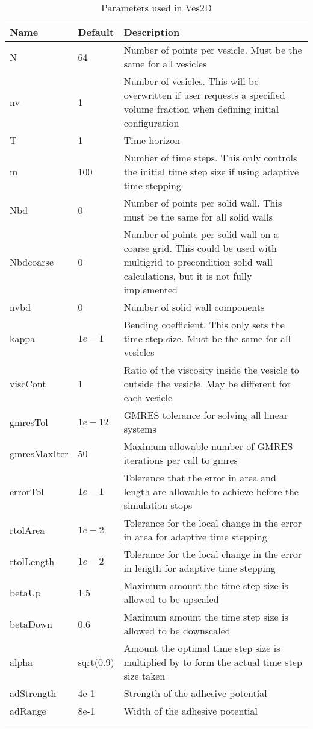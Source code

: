\documentclass[12pt]{article}
\begin{document}
\begin{longtable}{|l|l|m{8cm}|}
\hline
Name        & Default                  & 
  Description \\ \hline
N & 64 &  
Number of points per vesicle.  Must be the same for all vesicles \\ \hline
nv & 1 &  
Number of vesicles.  This will be overwritten if user requests a
specified volume fraction when defining initial configuration \\ \hline
T & 1 &  
Time horizon \\ \hline
m & 100 &  
Number of time steps.  This only controls the initial time step size if
using adaptive time stepping \\ \hline
Nbd & 0 &  
Number of points per solid wall.  This must be the same for all solid
walls \\ \hline
Nbdcoarse & 0 &  
Number of points per solid wall on a coarse grid.  This could be used
with multigrid to precondition solid wall calculations, but it is not
fully implemented \\ \hline
nvbd & 0 &  
Number of solid wall components \\ \hline
kappa & $1e-1$ &  
Bending coefficient.  This only sets the time step size.  Must be the
same for all vesicles \\ \hline
viscCont & 1 & 
Ratio of the viscosity inside the vesicle to outside the vesicle.  May
be different for each vesicle \\ \hline
gmresTol & $1e-12$ &  
GMRES tolerance for solving all linear systems \\ \hline
gmresMaxIter & 50 &
Maximum allowable number of GMRES iterations per call to gmres \\ \hline
errorTol & $1e-1$ &  
Tolerance that the error in area and length are allowable to achieve
before the simulation stops \\ \hline
rtolArea & $1e-2$ &  
Tolerance for the local change in the error in area for adaptive time
stepping \\ \hline
rtolLength & $1e-2$ &  
Tolerance for the local change in the error in length for adaptive time
stepping \\ \hline
betaUp & 1.5 &
Maximum amount the time step size is allowed to be upscaled \\ \hline
betaDown & 0.6 &
Maximum amount the time step size is allowed to be downscaled \\ \hline
alpha & sqrt(0.9) &
Amount the optimal time step size is multiplied by to form the actual
time step size taken \\ \hline
adStrength & 4e-1 & 
Strength of the adhesive potential \\ \hline
adRange & 8e-1 & 
Width of the adhesive potential \\ \hline
\caption{Parameters used in Ves2D}
\end{longtable}
\end{document}
